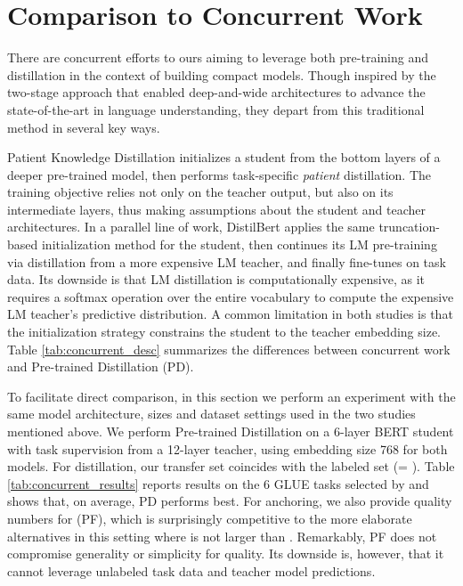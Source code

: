 \section{Comparison to Concurrent Work}
\label{sec:concurrent}


There are concurrent efforts to ours aiming to leverage both pre-training and distillation in the context of building compact models. Though inspired by the two-stage \ptft approach that enabled deep-and-wide architectures to advance the state-of-the-art in language understanding, they depart from this traditional method in several key ways.

Patient Knowledge Distillation \citep{patient_kd} initializes a student from the bottom layers of a deeper pre-trained model, then performs task-specific \emph{patient} distillation. The training objective relies not only on the teacher output, but also on its intermediate layers, thus making assumptions about the student and teacher architectures. In a parallel line of work, DistilBert \citep{distil_bert} applies the same truncation-based initialization method for the student, then continues its LM pre-training via distillation from a more expensive LM teacher, and finally fine-tunes on task data. Its downside is that LM distillation is computationally expensive, as it requires a softmax operation over the entire vocabulary to compute the expensive LM teacher's predictive distribution. A common limitation in both studies is that the initialization strategy constrains the student to the teacher embedding size. Table \ref{tab:concurrent_desc} summarizes the differences between concurrent work and Pre-trained Distillation (PD). 

To facilitate direct comparison, in this section we perform an experiment with the same model architecture, sizes and dataset settings used in the two studies mentioned above. We perform Pre-trained Distillation on a 6-layer BERT student with task supervision from a 12-layer \bb teacher, using embedding size 768 for both models. For distillation, our transfer set coincides with the labeled set (\DT = \DL). Table \ref{tab:concurrent_results} reports results on the 6 GLUE tasks selected by \citet{patient_kd} and shows that, on average, PD performs best. For anchoring, we also provide quality numbers for \ptft (PF), which is surprisingly competitive to the more elaborate alternatives in this setting where  {\DT} is not larger than {\DL}. Remarkably, PF does not compromise generality or simplicity for quality. Its downside is, however, that it cannot leverage unlabeled task data and teacher model predictions.